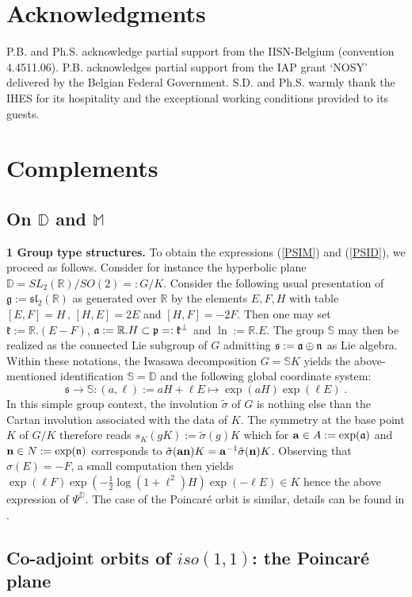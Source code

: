 \documentclass{article}
\newcommand{\la}{\frak{a}}
\newcommand{\lN}{\frak{n}}
\newcommand{\DD}{\mathbb D}
\renewcommand{\SS}{\mathbb S}
\newcommand{\R}{\mathbb R}
\newcommand{\MM}{\mathbb M}
\renewcommand{\gg}{\mathfrak g}
\renewcommand{\ss}{\mathfrak s}
\newcommand{\kk}{\mathfrak k}
\newcommand{\pp}{\mathfrak p}
\def \R{{\mathbb R}}
\begin{document}
\section*{Acknowledgments}
P.B. and Ph.S. acknowledge partial support from the IISN-Belgium (convention 4.4511.06). 
 P.B. acknowledges partial support from the IAP grant `NOSY' delivered by the Belgian Federal Government. S.D. and Ph.S.  warmly thank the IHES for its hospitality and the exceptional working conditions provided to its guests.


\appendix 
\section{Complements}\label{AppenB}

\subsection{On $\DD$ and $\MM$}
{\bf 1 Group type structures.} To obtain the expressions (\ref{PSIM}) and (\ref{PSID}), we proceed as follows. Consider for  instance the hyperbolic plane $\DD=SL_2(\R)/SO(2)=:G/K$. Consider the following usual presentation of $\gg:=\mathfrak{sl}_2(\R)$ as
generated over $\R$ by the elements $E,F,H$ with table $[E,F]=H\,,\,[H,E]=2E$ and $[H,F]=-2F$.
Then one may set $\kk:=\R.(E-F)$, $\la:=\R.H\subset\pp=:\kk^{\perp}$ and $\ln:=\R.E$. The group
$\SS$ may then be realized as the connected Lie subgroup of $G$ admitting $\ss:=\la\oplus\lN$ as Lie
algebra. Within these notations, the Iwasawa decomposition $G=\SS K$ yields the above-mentioned 
identification $\SS=\DD$ and the following global coordinate system:
\begin{equation}
\ss\longrightarrow\SS:(a,\ell):=aH+\ell E\mapsto\exp(a H)\exp(\ell E)\;.
\end{equation}
In this simple group context, the involution $\tilde{\sigma}$ of $G$ is nothing else than the Cartan involution
associated with the data of $K$. The symmetry at the base point $K$ of $G/K$ therefore reads
$s_K(gK):=\tilde{\sigma}(g)K$ which for ${\bf a}\in A:=\exp(\la)$ and ${\bf n}\in N:=\exp(\lN)$ corresponds to $\tilde{\sigma}({\bf an})K={\bf a}^{-1}\tilde{\sigma}({\bf n})K$. Observing that $\sigma(E)=-F$, a small
computation then yields $\exp(\ell F)\exp(-\frac{1}{2}\log(1+\ell^2)H)\exp(-\ell E)\in K$ hence  the above expression of $\Psi^\DD$. The case of the Poincar\'e orbit is similar, details can be found in \cite{PierreStrict}.

\subsection{Co-adjoint orbits of $iso(1,1)$: the Poincar\'e plane}
\end{document}
